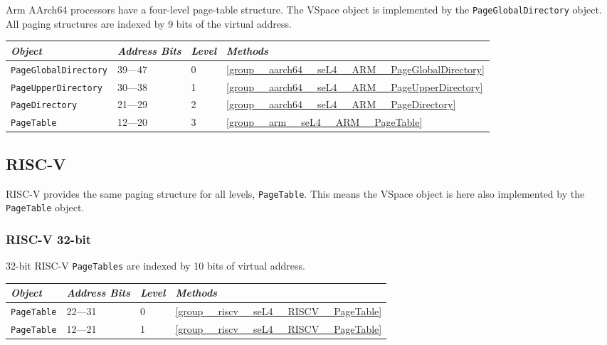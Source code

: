 Arm AArch64 processors have a four-level page-table structure. The VSpace object is implemented by the
\texttt{PageGlobalDirectory} object. All paging structures are indexed by 9 bits of the virtual address.

\begin{tabularx}{\textwidth}{Xlll} \toprule
\emph{Object}                    & \emph{Address Bits} & \emph{Level} & \emph{Methods} \\ \midrule
    \texttt{PageGlobalDirectory} & 39---47             & 0            & \autoref{group__aarch64__seL4__ARM__PageGlobalDirectory} \\
    \texttt{PageUpperDirectory}  & 30---38             & 1            & \autoref{group__aarch64__seL4__ARM__PageUpperDirectory} \\
\texttt{PageDirectory}           & 21---29             & 2            & \autoref{group__aarch64__seL4__ARM__PageDirectory} \\
\texttt{PageTable}               & 12---20             & 3            & \autoref{group__arm__seL4__ARM__PageTable} \\
\bottomrule
\end{tabularx}

\subsection{RISC-V}

RISC-V provides the same paging structure for all levels, \texttt{PageTable}. This means the VSpace
object is here also implemented by the \texttt{PageTable} object.

\subsubsection{RISC-V 32-bit}

32-bit RISC-V \texttt{PageTables} are indexed by 10 bits of virtual address.

\begin{tabularx}{\textwidth}{Xlll} \toprule
\emph{Object}          & \emph{Address Bits} & \emph{Level} & \emph{Methods} \\ \midrule
\texttt{PageTable}     & 22---31             & 0            & \autoref{group__riscv__seL4__RISCV__PageTable} \\
\texttt{PageTable}     & 12---21             & 1            & \autoref{group__riscv__seL4__RISCV__PageTable} \\
\bottomrule
\end{tabularx}


